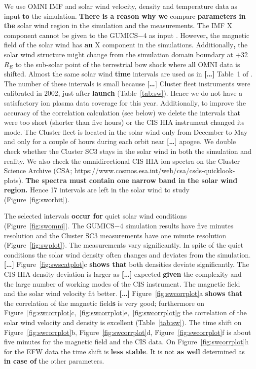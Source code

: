 \documentclass[linenumbers,draft]{agujournal}
\begin{document}
We use OMNI IMF and solar wind velocity, density and temperature data as input \textbf{to} the simulation. \textbf{There is a reason why we} compare \textbf{parameters in the} solar wind region in the simulation and the measurements. The IMF X component cannot be given to the GUMICS$-$4 as input \citep{janhunen12:_gumic_mhd,facsko16:_one_earth}. However\textbf{,} the magnetic field of the solar wind has \textbf{an} X component in the simulations. Additionally\textbf{,} the solar wind structure might change from the simulation domain boundary at +32\,$R_E$ to the sub-solar point of the terrestrial bow shock where all OMNI data is shifted. Almost the same solar wind \textbf{time} intervals are used as in \textbf{[\dots]} Table~1 of \citet{facsko16:_one_earth}. The number of these intervals is small because \textbf{[\dots]} Cluster fleet instruments were calibrated in 2002, just after \textbf{launch} (Table~\ref{tab:sw}). Hence we do not have a satisfactory ion plasma data coverage for this year. Additionally, to improve the accuracy of the correlation calculation (see below) we delete the intervals that were too short (shorter than five hours) or the CIS HIA instrument changed its mode. The Cluster fleet is located in the solar wind only from December to May and only for a couple of hours during each orbit near \textbf{[\dots]} apogee. We double check whether the Cluster SC3 stays in the solar wind in both the simulation and reality. We also check the omnidirectional CIS HIA ion spectra on the Cluster Science Archive (CSA; https://www.cosmos.esa.int/web/csa/csds-quicklook-plots). \textbf{The spectra must contain one narrow band in the solar wind region.} Hence 17 intervals are left in the solar wind to study (Figure~\ref{fig:sworbit}). 

The selected intervals \textbf{occur for} quiet solar wind conditions (Figure~\ref{fig:swomni}). The GUMICS$-$4 simulation results have five minutes resolution and the Cluster SC3 measurements have one minute resolution (Figure~\ref{fig:swplot}). The measurements vary significantly. In spite of the quiet conditions the solar wind density often changes and deviates from the simulation. \textbf{[\dots]} Figure~\ref{fig:swscatplot}c \textbf{shows that} both densities deviate significantly. The CIS HIA density deviation is larger as \textbf{[\dots]} expected \textbf{given} the complexity and the large number of working modes of the CIS instrument. The magnetic field and the solar wind velocity fit better. \textbf{[\dots]} Figure~\ref{fig:swcorrplot}a \textbf{shows that} the correlation of the magnetic field\textbf{s} is very good; furthermore on Figure~\ref{fig:swcorrplot}c,~\ref{fig:swcorrplot}e,~\ref{fig:swcorrplot}g the correlation of the solar wind velocity and density is excellent (Table~\ref{tab:sw}). The time shift on Figure~\ref{fig:swcorrplot}b, Figure~\ref{fig:swcorrplot}d, Figure~\ref{fig:swcorrplot}f is about five minutes for the magnetic field and the CIS data. On Figure~\ref{fig:swcorrplot}h for the EFW data the time shift is \textbf{less stable}. It is not \textbf{as well} determined as \textbf{in case of} the other parameters.
\end{document}
